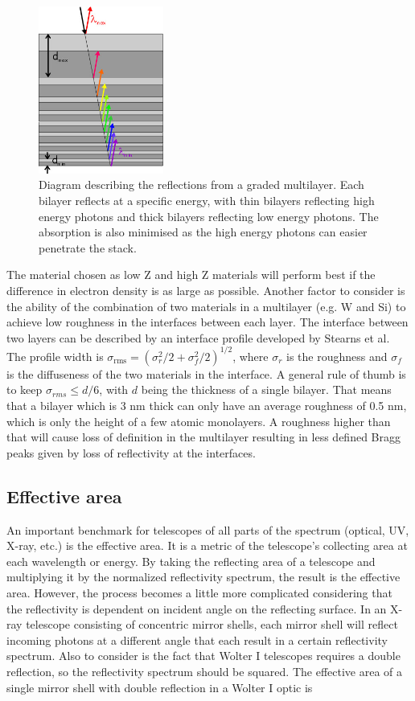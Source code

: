 \begin{figure}[!ht] %
	\centering	\includegraphics[height=5.5cm]{figures/introduction/multilayer.jpg}
	\caption{\footnotesize Diagram describing the reflections from a graded multilayer. Each bilayer reflects at a specific energy, with thin bilayers reflecting high energy photons and thick bilayers reflecting low energy photons. The absorption is also minimised as the high energy photons can easier penetrate the stack.}
	\label{fig:gradedmultilayer}
\end{figure}

The material chosen as low Z and high Z materials will perform best if the difference in electron density is as large as possible. Another factor to consider is the ability of the combination of two materials in a multilayer (e.g. W and Si) to achieve low roughness in the interfaces between each layer. The interface between two layers can be described by an interface profile developed by Stearns et al\cite{Stearns:1989va}. The profile width is $\sigma_{\text{rms}}=(\sigma_r^2/2 + \sigma_f^2/2)^{1/2}$, where $\sigma_r$ is the roughness and $\sigma_f$ is the diffuseness of the two materials in the interface. A general rule of thumb is to keep $\sigma_{rms} \leq d/6$, with $d$ being the thickness of a single bilayer. That means that a bilayer which is 3 nm thick can only have an average roughness of 0.5 nm, which is only the height of a few atomic monolayers. A roughness higher than that will cause loss of definition in the multilayer resulting in less defined Bragg peaks given by loss of reflectivity at the interfaces.

\subsection{Effective area}\label{sec:eff_area_intro}
An important benchmark for telescopes of all parts of the spectrum (optical, UV, X-ray, etc.) is the effective area. It is a metric of the telescope's collecting area at each wavelength or energy. By taking the reflecting area of a telescope and multiplying it by the normalized reflectivity spectrum, the result is the effective area. However, the process becomes a little more complicated considering that the reflectivity is dependent on incident angle on the reflecting surface. In an X-ray telescope consisting of concentric mirror shells, each mirror shell will reflect incoming photons at a different angle that each result in a certain reflectivity spectrum. Also to consider is the fact that Wolter I telescopes requires a double reflection, so the reflectivity spectrum should be squared. The effective area of a single mirror shell with double reflection in a Wolter I optic is


